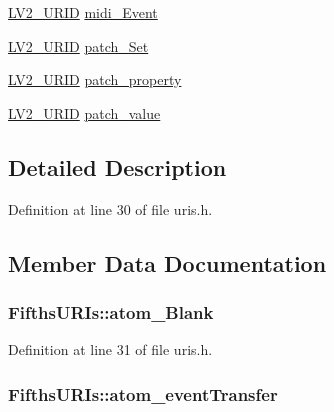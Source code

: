 \begin{DoxyCompactItemize}
\item 
\hyperlink{urid_8h_a5ff0630d245539e9f6dca10ff3c40fae}{L\+V2\+\_\+\+U\+R\+ID} \hyperlink{struct_fifths_u_r_is_a0ca76ff30a28dccd770d0585d1018b53}{midi\+\_\+\+Event}
\item 
\hyperlink{urid_8h_a5ff0630d245539e9f6dca10ff3c40fae}{L\+V2\+\_\+\+U\+R\+ID} \hyperlink{struct_fifths_u_r_is_ad0ef6cabd2b1afecb4423c775e277687}{patch\+\_\+\+Set}
\item 
\hyperlink{urid_8h_a5ff0630d245539e9f6dca10ff3c40fae}{L\+V2\+\_\+\+U\+R\+ID} \hyperlink{struct_fifths_u_r_is_a06c1b1534d80599d5d7ad1a5ff6cc888}{patch\+\_\+property}
\item 
\hyperlink{urid_8h_a5ff0630d245539e9f6dca10ff3c40fae}{L\+V2\+\_\+\+U\+R\+ID} \hyperlink{struct_fifths_u_r_is_ad499f8d012612a45ed252bbc6d4b1798}{patch\+\_\+value}
\end{DoxyCompactItemize}


\subsection{Detailed Description}


Definition at line 30 of file uris.\+h.



\subsection{Member Data Documentation}
\subsubsection[{\texorpdfstring{atom\+\_\+\+Blank}{atom_Blank}}]{ Fifths\+U\+R\+Is\+::atom\+\_\+\+Blank}\hypertarget{struct_fifths_u_r_is_a4fcce7dd3356a2a7510d813f616ab734}{}\label{struct_fifths_u_r_is_a4fcce7dd3356a2a7510d813f616ab734}


Definition at line 31 of file uris.\+h.

\subsubsection[{\texorpdfstring{atom\+\_\+event\+Transfer}{atom_eventTransfer}}]{ Fifths\+U\+R\+Is\+::atom\+\_\+event\+Transfer}\hypertarget{struct_fifths_u_r_is_aee856c74fe7f0bebbda5f66a710a51ec}{}\label{struct_fifths_u_r_is_aee856c74fe7f0bebbda5f66a710a51ec}


